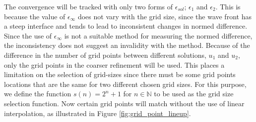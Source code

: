 The convergence will be tracked with only two forms of $\epsilon_{sol}$; $\epsilon_1$ and $\epsilon_2$.
This is because the value of $\epsilon_{\infty}$ does not vary with the grid size, since the wave front has a steep interface and tends to lead to inconsistent changes in normed difference.
Since the use of $\epsilon_{\infty}$ is not a suitable method for measuring the normed difference, the inconsistency does not suggest an invalidity with the method.
Because of the difference in the number of grid points between different solutions, $u_1$ and $u_2$, only the grid points in the coarser refinement will be used.
This places a limitation on the selection of grid-sizes since there must be some grid points locations that are the same for two different chosen grid sizes.
For this purpose, we define the function $s(n) = 2^{n}+1$ for $n \in \mathbb{N}$ to be used as the grid size selection function.
Now certain grid points will match without the use of linear interpolation, as illustrated in Figure \ref{fig:grid_point_lineup}.


